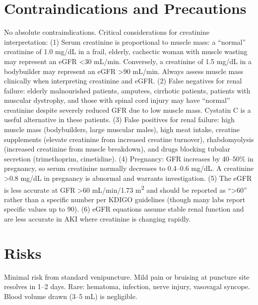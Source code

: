 \section*{Contraindications and Precautions}
No absolute contraindications. Critical considerations for creatinine interpretation: (1) Serum creatinine is proportional to muscle mass: a ``normal'' creatinine of 1.0 mg/dL in a frail, elderly, cachectic woman with muscle wasting may represent an eGFR <30 mL/min. Conversely, a creatinine of 1.5 mg/dL in a bodybuilder may represent an eGFR >90 mL/min. Always assess muscle mass clinically when interpreting creatinine and eGFR. (2) False negatives for renal failure: elderly malnourished patients, amputees, cirrhotic patients, patients with muscular dystrophy, and those with spinal cord injury may have ``normal'' creatinine despite severely reduced GFR due to low muscle mass. Cystatin C is a useful alternative in these patients. (3) False positives for renal failure: high muscle mass (bodybuilders, large muscular males), high meat intake, creatine supplements (elevate creatinine from increased creatine turnover), rhabdomyolysis (increased creatinine from muscle breakdown), and drugs blocking tubular secretion (trimethoprim, cimetidine). (4) Pregnancy: GFR increases by 40--50\% in pregnancy, so serum creatinine normally decreases to 0.4--0.6 mg/dL. A creatinine >0.8 mg/dL in pregnancy is abnormal and warrants investigation. (5) The eGFR is less accurate at GFR >60 mL/min/1.73 m\textsuperscript{2} and should be reported as ``>60'' rather than a specific number per KDIGO guidelines (though many labs report specific values up to 90). (6) eGFR equations assume stable renal function and are less accurate in AKI where creatinine is changing rapidly.

\section*{Risks}
Minimal risk from standard venipuncture. Mild pain or bruising at puncture site resolves in 1--2 days. Rare: hematoma, infection, nerve injury, vasovagal syncope. Blood volume drawn (3--5 mL) is negligible.

